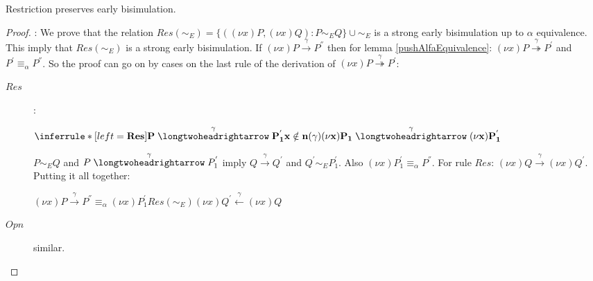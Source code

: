 \begin{lemma}\label{restrictionPreservesEarlyBisimulation}
  Restriction preserves early bisimulation.
  \begin{proof}:
      We prove that the relation $Res(\sim_{E})=\{((\nu x)P, (\nu x)Q): P\sim_{E} Q\} \cup \sim_{E}$ is a strong early bisimulation up to $\alpha$ equivalence. This imply that $Res(\sim_{E})$ is a strong early bisimulation. If $(\nu x)P\xrightarrow{\gamma}P^{''}$ then for lemma \ref{pushAlfaEquivalence}: $(\nu x)P\stackrel{\gamma}{\twoheadrightarrow}P^{'}$ and $P^{'}\equiv_{\alpha}P^{''}$. So the proof can go on by cases on the last rule of the derivation of $(\nu x)P\stackrel{\gamma}{\twoheadrightarrow} P^{'}$:
	\begin{description}
 	  \item[$Res$]:
   	    \begin{center}
   	      $\inferrule* [left=\bf{Res}]{
		    P \stackrel{\gamma}{\longtwoheadrightarrow} P_{1}^{'}
		  \\
		    x \notin n(\gamma)
		  }{
		    (\nu x)P_{1} \stackrel{\gamma}{\longtwoheadrightarrow} (\nu x)P_{1}^{'}
	      }$
   	    \end{center}
 	    $P\sim_{E}Q$ and $P \stackrel{\gamma}{\longtwoheadrightarrow} P_{1}^{'}$ imply $Q \xrightarrow{\gamma} Q^{'}$ and $Q^{'} \sim_{E} P_{1}^{'}$. Also $(\nu x)P_{1}^{'} \equiv_{\alpha} P^{''}$. For rule $Res$: $(\nu x)Q \xrightarrow{\gamma} (\nu x)Q^{'}$. Putting it all together:
 	    \begin{center}
 	      $(\nu x)P \xrightarrow{\gamma} P^{''} \equiv_{\alpha} (\nu x)P_{1}^{'}  Res(\sim_{E}) (\nu x)Q^{'} \stackrel{\gamma}{\leftarrow} (\nu x)Q$
 	    \end{center}
  	  \item[$Opn$] similar.
	\end{description}
  \end{proof}
\end{lemma}


